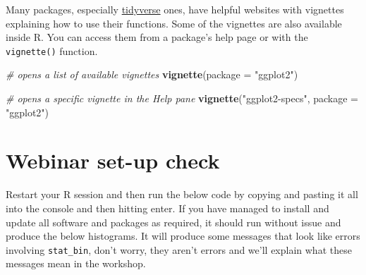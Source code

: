 \documentclass[
  oneside]{book}
\newenvironment{Shaded}{\begin{snugshade}}{\end{snugshade}}
\newcommand{\AttributeTok}[1]{\textcolor[rgb]{0.13,0.29,0.53}{#1}}
\newcommand{\CommentTok}[1]{\textcolor[rgb]{0.56,0.35,0.01}{\textit{#1}}}
\newcommand{\FunctionTok}[1]{\textcolor[rgb]{0.13,0.29,0.53}{\textbf{#1}}}
\newcommand{\NormalTok}[1]{#1}
\newcommand{\StringTok}[1]{\textcolor[rgb]{0.31,0.60,0.02}{#1}}
\begin{document}
Many packages, especially \href{https://www.tidyverse.org/packages/}{tidyverse} ones, have helpful websites with vignettes explaining how to use their functions. Some of the vignettes are also available inside R. You can access them from a package's help page or with the \texttt{vignette()} function.

\begin{Shaded}
\begin{Highlighting}[]
\CommentTok{\# opens a list of available vignettes}
\FunctionTok{vignette}\NormalTok{(}\AttributeTok{package =} \StringTok{"ggplot2"}\NormalTok{)}

\CommentTok{\# opens a specific vignette in the Help pane}
\FunctionTok{vignette}\NormalTok{(}\StringTok{"ggplot2{-}specs"}\NormalTok{, }\AttributeTok{package =} \StringTok{"ggplot2"}\NormalTok{)}
\end{Highlighting}
\end{Shaded}

\section{Webinar set-up check}\label{workshop-prep}

Restart your R session and then run the below code by copying and pasting it all into the console and then hitting enter. If you have managed to install and update all software and packages as required, it should run without issue and produce the below histograms. It will produce some messages that look like errors involving \texttt{stat\_bin}, don't worry, they aren't errors and we'll explain what these messages mean in the workshop.
\end{document}

